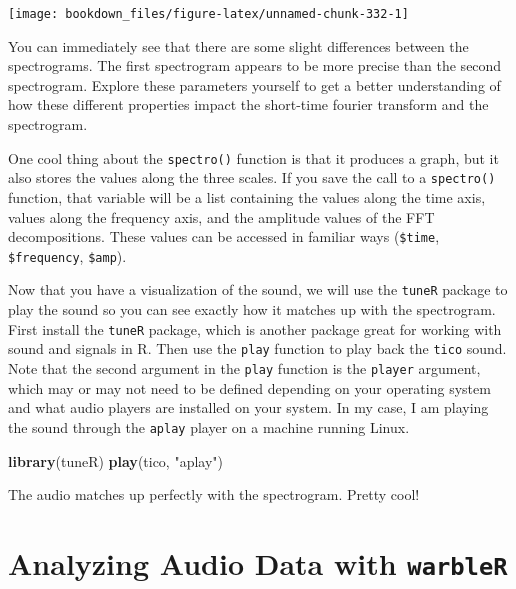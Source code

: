 \documentclass[
]{krantz}
\makeatletter
\newenvironment{Shaded}{\begin{snugshade}}{\end{snugshade}}
\newcommand{\KeywordTok}[1]{\textcolor[rgb]{0.27,0.27,0.27}{\textbf{#1}}}
\newcommand{\NormalTok}[1]{#1}
\newcommand{\StringTok}[1]{\textcolor[rgb]{0.5,0.5,0.5}{#1}}
\newenvironment{kframe}{%
\medskip{}
\setlength{\fboxsep}{.8em}
 \def\at@end@of@kframe{}%
 \ifinner\ifhmode%
  \def\at@end@of@kframe{\end{minipage}}%
  \begin{minipage}{\columnwidth}%
 \fi\fi%
 \def\FrameCommand##1{\hskip\@totalleftmargin \hskip-\fboxsep
 \colorbox{shadecolor}{##1}\hskip-\fboxsep
     \hskip-\linewidth \hskip-\@totalleftmargin \hskip\columnwidth}%
 \MakeFramed {\advance\hsize-\width
   \@totalleftmargin\z@ \linewidth\hsize
   \@setminipage}}%
 {\par\unskip\endMakeFramed%
 \at@end@of@kframe}
\renewenvironment{Shaded}{\begin{kframe}}{\end{kframe}}
\makeatother
\begin{document}
\texttt{[image: bookdown\_files/figure-latex/unnamed-chunk-332-1]}

You can immediately see that there are some slight differences between the spectrograms. The first spectrogram appears to be more precise than the second spectrogram. Explore these parameters yourself to get a better understanding of how these different properties impact the short-time fourier transform and the spectrogram.

One cool thing about the \texttt{spectro()} function is that it produces a graph, but it also stores the values along the three scales. If you save the call to a \texttt{spectro()} function, that variable will be a list containing the values along the time axis, values along the frequency axis, and the amplitude values of the FFT decompositions. These values can be accessed in familiar ways (\texttt{\$time}, \texttt{\$frequency}, \texttt{\$amp}).

Now that you have a visualization of the sound, we will use the \texttt{tuneR} package to play the sound so you can see exactly how it matches up with the spectrogram. First install the \texttt{tuneR} package, which is another package great for working with sound and signals in R. Then use the \texttt{play} function to play back the \texttt{tico} sound. Note that the second argument in the \texttt{play} function is the \texttt{player} argument, which may or may not need to be defined depending on your operating system and what audio players are installed on your system. In my case, I am playing the sound through the \texttt{aplay} player on a machine running Linux.

\begin{Shaded}
\begin{Highlighting}[]
\KeywordTok{library}\NormalTok{(tuneR)}
\KeywordTok{play}\NormalTok{(tico, }\StringTok{"aplay"}\NormalTok{)}
\end{Highlighting}
\end{Shaded}

The audio matches up perfectly with the spectrogram. Pretty cool!

\hypertarget{analyzing-audio-data-with-warbler}{%
\section{\texorpdfstring{Analyzing Audio Data with \texttt{warbleR}}{Analyzing Audio Data with warbleR}}\label{analyzing-audio-data-with-warbler}}
\end{document}

